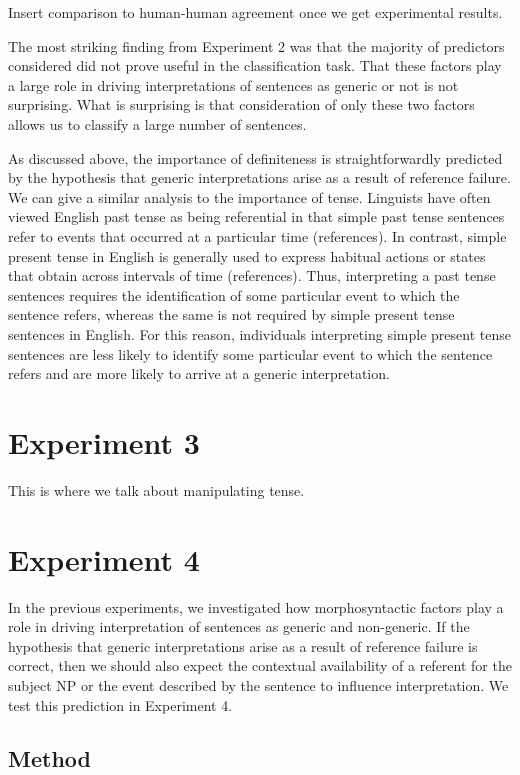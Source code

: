 \documentclass[10pt,letterpaper]{article}
\begin{document}
Insert comparison to human-human agreement once we get experimental results.

The most striking finding from Experiment 2 was that the majority of predictors considered did not prove useful in the classification task. That these factors play a large role in driving interpretations of sentences as generic or not is not surprising. What is surprising is that consideration of only these two factors allows us to classify a large number of sentences.

As discussed above, the importance of definiteness is straightforwardly predicted by the hypothesis that generic interpretations arise as a result of reference failure. We can give a similar analysis to the importance of tense. Linguists have often viewed English past tense as being referential in that simple past tense sentences refer to events that occurred at a particular time (references). In contrast, simple present tense in English is generally used to express habitual actions or states that obtain across intervals of time (references). Thus, interpreting a past tense sentences requires the identification of some particular event to which the sentence refers, whereas the same is not required by simple present tense sentences in English. For this reason, individuals interpreting simple present tense sentences are less likely to identify some particular event to which the sentence refers and are more likely to arrive at a generic interpretation.

\section{Experiment 3}

This is where we talk about manipulating tense.

\section{Experiment 4}

In the previous experiments, we investigated how morphosyntactic factors play a role in driving interpretation of sentences as generic and non-generic. If the hypothesis that generic interpretations arise as a result of reference failure is correct, then we should also expect the contextual availability of a referent for the subject NP or the event described by the sentence to influence interpretation. We test this prediction in Experiment 4.

\subsection{Method}
\end{document}
